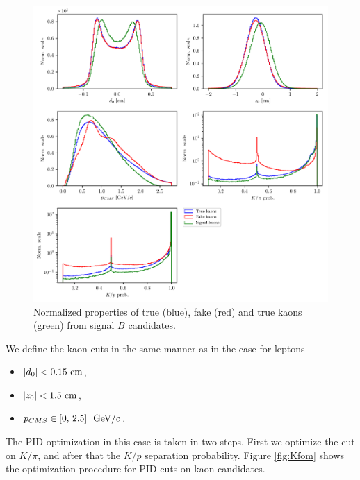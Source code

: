 \begin{figure}[H]
\centering
\includegraphics[width=\linewidth]{fig/FSP_kaon_vars}
\captionsetup{width=.8\linewidth}
\caption{Normalized properties of true (blue), fake (red) and true kaons (green) from signal $B$ candidates.}
\label{fig:Kvars}
\end{figure}

We define the kaon cuts in the same manner as in the case for leptons
\begin{itemize}
\item $\vert d_0 \vert < 0.15\mathrm{~cm}$,
\item $\vert z_0 \vert < 1.5\mathrm{~cm}$,
\item $p_{CMS} \in [0,\,2.5]~\mathrm{~GeV}/c$.
\end{itemize}

The PID optimization in this case is taken in two steps. First we optimize the cut on $K / \pi$, and after that the $K/p$ separation probability. Figure \ref{fig:Kfom} shows the optimization procedure for PID cuts on kaon candidates.

